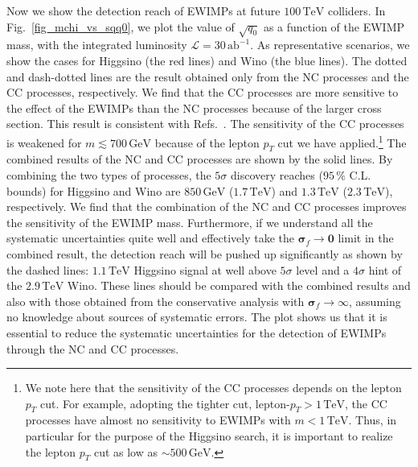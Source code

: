 \documentclass[12pt, a4paper]{article}
\begin{document}
Now we show the detection reach of EWIMPs at future
$100\,\mathrm{TeV}$ colliders.  In Fig.~\ref{fig_mchi_vs_sqq0}, we
plot the value of $\sqrt{q_0}$ as a function of the EWIMP mass, with
the integrated luminosity $\mathcal{L}=30\,\mathrm{ab}^{-1}$.  As
representative scenarios, we show the cases for Higgsino (the red
lines) and Wino (the blue lines).  The dotted and dash-dotted lines
are the result obtained only from the NC processes and the CC processes,
respectively.  We find that the CC processes are more sensitive to the
effect of the EWIMPs than the NC processes because of the larger cross
section.  This result is consistent with Refs.~\cite{DiLuzio:2018jwd,Matsumoto:2018ioi}.
The sensitivity of the CC processes is weakened for $m \lesssim 700\,
\mathrm{GeV}$ %
because of the lepton $p_T$ cut we have applied.\footnote{
  We note here that the sensitivity of the CC processes depends on the
  lepton $p_T$ cut.  For example, adopting the tighter cut,
  lepton-$p_T > 1\,\mathrm{TeV}$, the CC processes have almost no
  sensitivity to EWIMPs with $m < 1\,\mathrm{TeV}$.  Thus, in
  particular for the purpose of the Higgsino search, it is important
  to realize the lepton $p_T$ cut as low as $\sim 500\, \mathrm{GeV}$.
} The combined results of the NC and CC processes are shown by the
solid lines.  By combining the two types of processes, the $5\sigma$
discovery reaches ($95\,\%$ C.L. bounds) for Higgsino and Wino are
$850\,\mathrm{GeV}$ ($1.7\,\mathrm{TeV}$) and $1.3\,\mathrm{TeV}$
($2.3\,\mathrm{TeV}$), respectively.  We find that the combination of
the NC and CC processes improves the sensitivity of the EWIMP mass.
Furthermore, if we understand all the systematic uncertainties quite
well and effectively take the $\bm{\sigma}_f \to \bm{0}$ limit in the
combined result, the detection reach will be pushed up significantly
as shown by the dashed lines: $1.1\,\mathrm{TeV}$ Higgsino signal at
well above $5\sigma$ level and a $4\sigma$ hint of the
$2.9\,\mathrm{TeV}$ Wino.  These lines should be compared with the
combined results and also with those obtained from the conservative
analysis with $\bm{\sigma}_f \to \infty$, assuming no knowledge about
sources of systematic errors.  The plot shows us that it is essential
to reduce the systematic uncertainties for the detection of EWIMPs
through the NC and CC processes.
\end{document}
